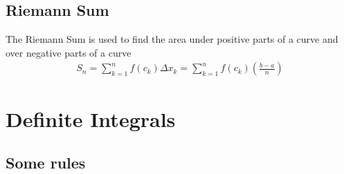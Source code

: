 \documentclass{article}
\newcommand\regsum{\sum_{k=1}^{n}}
\begin{document}
    \subsection{Riemann Sum}
        The Riemann Sum is used to find the area under positive parts of a curve and over negative parts of a curve
        \begin{gather*}
            S_n = \regsum f(c_k)\Delta x_k = \regsum f(c_k)\left(\frac{b-a}{n}\right)
            \end{gather*}
\section{Definite Integrals}
    \subsection{Some rules}
        
    
\end{document}
